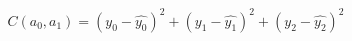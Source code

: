 \documentclass[preview]{standalone}
\begin{document}
\begin{align*}
C(a_0, a_1) = (y_0 - \hat{y_0})^2 + (y_1 - \hat{y_1})^2 + (y_2 - \hat{y_2})^2
\end{align*}
\end{document}
